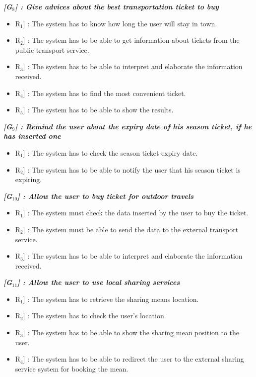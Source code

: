 \vspace{0.5cm}
\noindent
\emph{\textbf{[G$_{8}$] : Give advices about the best transportation ticket to buy}}
\begin{itemize}
	\setlength{\leftskip}{0.5cm}
	\item \lbrack R$_{1}$] : The system has to know how long the user will stay in town.
	\item \lbrack R$_{2}$] : The system has to be able to get information about tickets from the public transport service.
	\item \lbrack R$_{3}$] : The system has to be able to interpret and elaborate the information received.
	\item \lbrack R$_{4}$] : The system has to find the most convenient ticket.
	\item \lbrack R$_{5}$] : The system has to be able to show the results.
\end{itemize}

\vspace{0.5cm}
\noindent
\emph{\textbf{[G$_{9}$] : Remind the user about the expiry date of his season ticket, if he has inserted one}}
\begin{itemize}
	\setlength{\leftskip}{0.5cm}
	\item \lbrack R$_{1}$] : The system has to check the season ticket expiry date.
	\item \lbrack R$_{2}$] : The system has to be able to notify the user that his season ticket is expiring.
\end{itemize}

\vspace{0.5cm}
\noindent
\emph{\textbf{[G$_{10}$] : Allow the user to buy ticket for outdoor travels}}
\begin{itemize}
	\setlength{\leftskip}{0.5cm}
	\item \lbrack R$_{1}$] : The system must check the data inserted by the user to buy the ticket.
	\item \lbrack R$_{2}$] : The system must be able to send the data to the external transport service.
	\item \lbrack R$_{3}$] : The system has to be able to interpret and elaborate the information received.
\end{itemize}

\vspace{0.5cm}
\noindent
\emph{\textbf{[G$_{11}$] : Allow the user to use local sharing services}}
\begin{itemize}
	\setlength{\leftskip}{0.5cm}
	\item \lbrack R$_{1}$] : The system has to retrieve the sharing means location.
	\item \lbrack R$_{2}$] : The system has to check the user's location.
	\item \lbrack R$_{3}$] : The system has to be able to show the sharing mean position to the user.
	\item \lbrack R$_{4}$] : The system has to be able to redirect the user to the external sharing service system for booking the mean.
\end{itemize}

